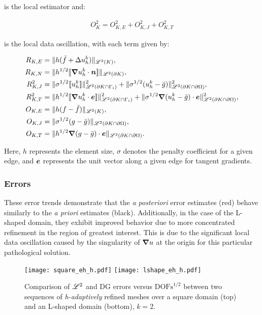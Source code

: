is the local estimator and:

\begin{gather}
	O_K^2 = O_{K, E}^2 + O_{K, J}^2 + O_{K, T}^2
\end{gather}

is the local data oscillation, with each term given by:

\begin{align}
	R_{K, E} &= \lVert h (\bar{f} + \Delta u^k_h) \rVert_{\mathscr{L}^2(K)}, \\
	R_{K, N} &= \lVert h^{1/2} \llbracket \bm{\nabla} u^k_h \cdot \bm{n} \rrbracket \rVert_{\mathscr{L}^2(\partial K)}, \\
	R^2_{K, J} &= \lVert \sigma^{1/2} \llbracket u^k_h \rrbracket \rVert^2_{\mathscr{L}^2(\partial K \cap \Gamma_{i})} + \lVert \sigma^{1/2} (u^k_h - \bar{g}) \rVert^2_{\mathscr{L}^2(\partial K \cap \partial \Omega)}, \\
	R^2_{K, T} &= \lVert h^{1/2} \llbracket \bm{\nabla} u^k_h \cdot \bm{e} \rrbracket \rVert^2_{\mathscr{L}^2(\partial K \cap \Gamma_{i})} + \lVert \sigma^{1/2} \bm{\nabla} (u^k_h - \bar{g}) \cdot \bm{e} \rVert^2_{\mathscr{L}^2(\partial K \cap \partial \Omega)}, \\
	O_{K, E} &= \lVert h (f - \bar{f}) \rVert_{\mathscr{L}^2(K)}, \\
	O_{K, J} &= \lVert \sigma^{1/2} (g - \bar{g}) \rVert_{\mathscr{L}^2(\partial K \cap \partial \Omega)}, \\
	O_{K, T} &= \lVert h^{1/2} \bm{\nabla} (g - \bar{g}) \cdot \bm{e} \rVert_{\mathscr{L}^2(\partial K \cap \partial \Omega)}.
\end{align}

Here, $h$ represents the element size, $\sigma$ denotes the penalty coefficient for a given edge, and $\bm{e}$ represents the unit vector along a given edge for tangent gradients.

\newpage
\subsubsection{Errors}

These error trends demonstrate that the \textit{a posteriori} error estimates (red) behave similarly to the \textit{a priori} estimates (black). Additionally, in the case of the L-shaped domain, they exhibit improved behavior due to more concentrated refinement in the region of greatest interest. This is due to the significant local data oscillation caused by the singularity of $\bm{\nabla} u$ at the origin for this particular pathological solution.

\begin{figure}[!ht]
	\centering
	\texttt{[image: square\_eh\_h.pdf]}
    \texttt{[image: lshape\_eh\_h.pdf]}
	\caption{Comparison of $\mathscr{L}^2$ and DG errors versus $\text{DOFs}^{1/2}$ between two sequences of \textit{h-adaptively} refined meshes over a square domain (top) and an L-shaped domain (bottom), $k = 2$.}
\end{figure}


